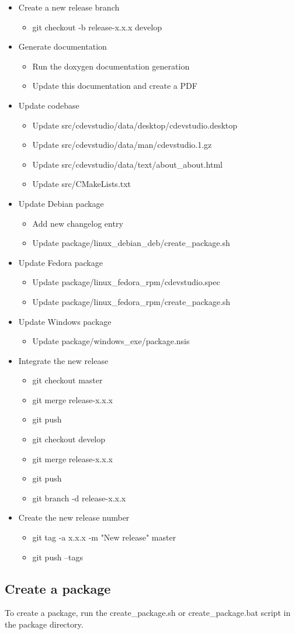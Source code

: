 \documentclass{article}
\begin{document}
\begin{itemize}
	\item Create a new release branch
	\begin{itemize}
		\item git checkout -b release-x.x.x develop
	\end{itemize}
	\item Generate documentation
	\begin{itemize}
		\item Run the doxygen documentation generation
		\item Update this documentation and create a PDF
	\end{itemize}
	\item Update codebase
	\begin{itemize}
		\item Update src/cdevstudio/data/desktop/cdevstudio.desktop
		\item Update src/cdevstudio/data/man/cdevstudio.1.gz
		\item Update src/cdevstudio/data/text/about_about.html
		\item Update src/CMakeLists.txt
	\end{itemize}
	\item Update Debian package
	\begin{itemize}
		\item Add new changelog entry
		\item Update package/linux_debian_deb/create_package.sh
	\end{itemize}
	\item Update Fedora package
	\begin{itemize}
		\item Update package/linux_fedora_rpm/cdevstudio.spec
		\item Update package/linux_fedora_rpm/create_package.sh
	\end{itemize}
	\item Update Windows package
	\begin{itemize}
		\item Update package/windows_exe/package.nsis
	\end{itemize}
	\item Integrate the new release
	\begin{itemize}
		\item git checkout master
		\item git merge release-x.x.x
		\item git push
		\item git checkout develop
		\item git merge release-x.x.x
		\item git push
		\item git branch -d release-x.x.x
	\end{itemize}
	\item Create the new release number
	\begin{itemize}
		\item git tag -a x.x.x -m "New release" master
		\item git push --tags
	\end{itemize}
\end{itemize}

\subsection{Create a package}
To create a package, run the create_package.sh or create_package.bat script in the package directory.
\end{document}
